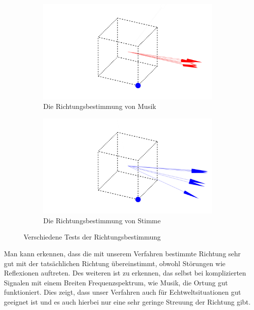 \begin{figure}[H]
\begin{subfigure}[b]{0.475\textwidth}
    \includegraphics[width=\textwidth]{img/music.png}
    \caption{Die Richtungsbestimmung von Musik\label{fig:music}}
  \end{subfigure}
  \hfill
  \begin{subfigure}[b]{0.475\textwidth}
    \centering
    \includegraphics[width=\textwidth]{img/sprechen.png}
    \caption{Die Richtungsbestimmung von Stimme\label{fig:speech}}
  \end{subfigure}

  \caption{Verschiedene Tests der Richtungsbestimmung}
  \label{fig:tests}
\end{figure}
Man kann erkennen, dass die mit unserem Verfahren bestimmte Richtung sehr gut mit der tatsächlichen Richtung übereinstimmt, obwohl Störungen wie Reflexionen auftreten. Des weiteren ist zu erkennen, das selbst bei komplizierten Signalen mit einem Breiten Frequenzspektrum, wie Musik, die Ortung gut funktioniert. Dies zeigt, dass unser Verfahren auch für Echtweltsituationen gut geeignet ist und es auch hierbei nur eine sehr geringe Streuung der Richtung gibt.